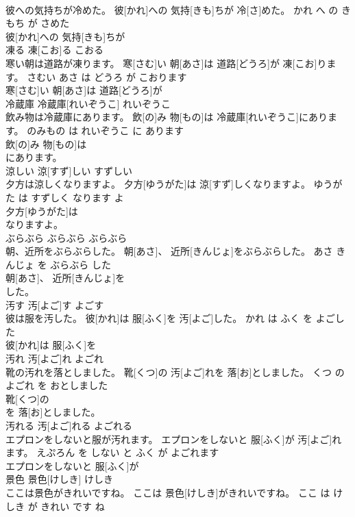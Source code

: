 \documentclass[8pt]{extreport}
\begin{document}
\begin{CJK}{UTF8}{min}
\\	彼への気持ちが冷めた。	彼[かれ]への 気持[きも]ちが 冷[さ]めた。	かれ へ の きもち が さめた	
\\	彼[かれ]への 気持[きも]ちが
\\	凍る	凍[こお]る	こおる	
\\	寒い朝は道路が凍ります。	寒[さむ]い 朝[あさ]は 道路[どうろ]が 凍[こお]ります。	さむい あさ は どうろ が こおります	
\\	寒[さむ]い 朝[あさ]は 道路[どうろ]が
\\	冷蔵庫	冷蔵庫[れいぞうこ]	れいぞうこ	
\\	飲み物は冷蔵庫にあります。	飲[の]み 物[もの]は 冷蔵庫[れいぞうこ]にあります。	のみもの は れいぞうこ に あります	
\\	飲[の]み 物[もの]は
\\	にあります。		
\\	涼しい	涼[すず]しい	すずしい	
\\	夕方は涼しくなりますよ。	夕方[ゆうがた]は 涼[すず]しくなりますよ。	ゆうがた は すずしく なります よ	
\\	夕方[ゆうがた]は
\\	なりますよ。		
\\	ぶらぶら	ぶらぶら	ぶらぶら	
\\	朝、近所をぶらぶらした。	朝[あさ]、 近所[きんじょ]をぶらぶらした。	あさ きんじょ を ぶらぶら した	
\\	朝[あさ]、 近所[きんじょ]を
\\	した。		
\\	汚す	汚[よご]す	よごす	
\\	彼は服を汚した。	彼[かれ]は 服[ふく]を 汚[よご]した。	かれ は ふく を よごした	
\\	彼[かれ]は 服[ふく]を
\\	汚れ	汚[よご]れ	よごれ	
\\	靴の汚れを落としました。	靴[くつ]の 汚[よご]れを 落[お]としました。	くつ の よごれ を おとしました	
\\	靴[くつ]の
\\	を 落[お]としました。		
\\	汚れる	汚[よご]れる	よごれる	
\\	エプロンをしないと服が汚れます。	エプロンをしないと 服[ふく]が 汚[よご]れます。	えぷろん を しない と ふく が よごれます	
\\	エプロンをしないと 服[ふく]が
\\	景色	景色[けしき]	けしき	
\\	ここは景色がきれいですね。	ここは 景色[けしき]がきれいですね。	ここ は けしき が きれい です ね	

\end{CJK}
\end{document}
